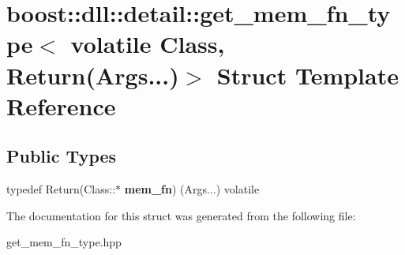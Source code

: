 \hypertarget{a01424}{}\section{boost\+:\+:dll\+:\+:detail\+:\+:get\+\_\+mem\+\_\+fn\+\_\+type$<$ volatile Class, Return(Args...)$>$ Struct Template Reference}
\label{a01424}
\subsection*{Public Types}
\begin{DoxyCompactItemize}
\item 
\mbox{\label{a01424_a2650686f0a64897ada9a29c2f55f8f86}} 
typedef Return(Class\+::$\ast$ {\bfseries mem\+\_\+fn}) (Args...) volatile
\end{DoxyCompactItemize}


The documentation for this struct was generated from the following file\+:\begin{DoxyCompactItemize}
\item 
get\+\_\+mem\+\_\+fn\+\_\+type.\+hpp\end{DoxyCompactItemize}
